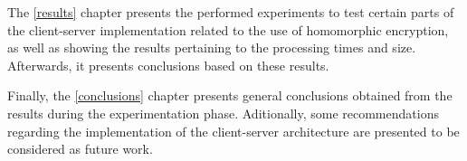 The \ref{results} chapter presents the performed experiments to test certain parts of the client-server implementation related to the use of homomorphic encryption, as well as showing the results pertaining to the processing times and size. Afterwards, it presents conclusions based on these results.

Finally, the \ref{conclusions} chapter presents general conclusions obtained from the results during the experimentation phase. Aditionally, some recommendations regarding the implementation of the client-server architecture are presented to be considered as future work.

\clearpage
